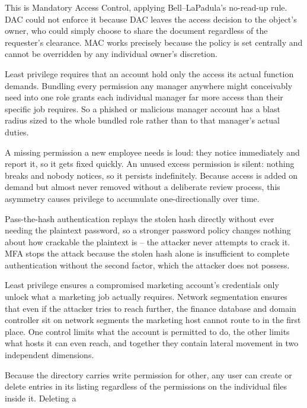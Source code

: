\begin{answerkey}
\item This is Mandatory Access Control, applying Bell--LaPadula's no-read-up rule. DAC could not
enforce it because DAC leaves the access decision to the object's owner, who could simply choose to
share the document regardless of the requester's clearance. MAC works precisely because the policy
is set centrally and cannot be overridden by any individual owner's discretion.
\item Least privilege requires that an account hold only the access its actual function demands.
Bundling every permission any manager anywhere might conceivably need into one role grants each
individual manager far more access than their specific job requires. So a phished or malicious
manager account has a blast radius sized to the whole bundled role rather than to that manager's
actual duties.
\item A missing permission a new employee needs is loud: they notice immediately and report it, so
it gets fixed quickly. An unused excess permission is silent: nothing breaks and nobody notices, so
it persists indefinitely. Because access is added on demand but almost never removed without a
deliberate review process, this asymmetry causes privilege to accumulate one-directionally over
time.
\item Pass-the-hash authentication replays the stolen hash directly without ever needing the
plaintext password, so a stronger password policy changes nothing about how crackable the plaintext
is -- the attacker never attempts to crack it. MFA stops the attack because the stolen hash alone is
insufficient to complete authentication without the second factor, which the attacker does not
possess.
\item Least privilege ensures a compromised marketing account's credentials only unlock what a
marketing job actually requires. Network segmentation ensures that even if the attacker tries
to reach further, the finance database and domain controller sit on network segments the
marketing host cannot route to in the first place. One control limits what the account is
permitted to do, the other limits what hosts it can even reach, and together they contain lateral
movement in two independent dimensions.
\item Because the directory carries write permission for other, any user can create or delete
entries in its listing regardless of the permissions on the individual files inside it. Deleting a

\end{answerkey}
